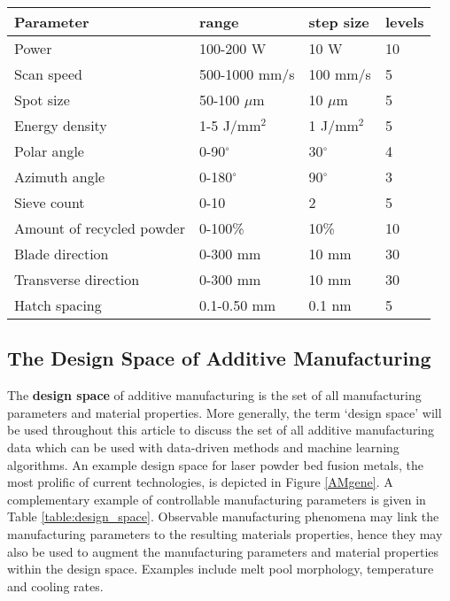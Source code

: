 
\begin{table*}[t]
    \renewcommand{\arraystretch}{0.8}
    \setlength{\tabcolsep}{5pt}
    \begin{center}
        \begin{tabular}{@{}llll@{}}
            \toprule
            \hline
             Parameter & range & step size & levels \\ \midrule
            \hline
            \hline
            Power & 100-200 W & 10 W & 10 \\
            Scan speed & 500-1000 mm/s & 100 mm/s & 5 \\
            Spot size & 50-100 $\mu$m & 10 $\mu$m & 5 \\
            Energy density & 1-5 J/mm$^2$ & 1 J/mm$^2$ & 5 \\
            Polar angle & 0-90$^\circ$ & 30$^\circ$  & 4 \\
            Azimuth angle & 0-180$^\circ$ & 90$^\circ$  & 3 \\
            Sieve count & 0-10 & 2 & 5 \\
            Amount of recycled powder & 0-100\% & 10\% & 10 \\
            Blade direction & 0-300 mm & 10 mm  & 30 \\
            Transverse direction & 0-300 mm & 10 mm  & 30 \\
            Hatch spacing & 0.1-0.50 mm & 0.1 nm  & 5 \\
            \hline
            \bottomrule
        \end{tabular}
        \caption{A possible design space for laser powder bed fusion additive manufacturing. There are over $10^9$ possible combinations of machine inputs, based on the listed ranges and step sizes. Any possible combination of these parameters is a point in the design space.}
        \label{table:design_space}
    \end{center}
\end{table*}

\subsection{The Design Space of Additive Manufacturing}

The \textbf{design space} of additive manufacturing is the set of all manufacturing parameters and material properties. More generally, the term `design space' will be used throughout this article to discuss the set of all additive manufacturing data which can be used with data-driven methods and machine learning algorithms. An example design space for laser powder bed fusion metals, the most prolific of current technologies, is depicted in Figure \ref{AMgene}. A complementary example of controllable manufacturing parameters is given in Table \ref{table:design_space}. Observable manufacturing phenomena may link the manufacturing parameters to the resulting materials properties, hence they may also be used to augment the manufacturing parameters and material properties within the design space. Examples include melt pool morphology, temperature and cooling rates.

